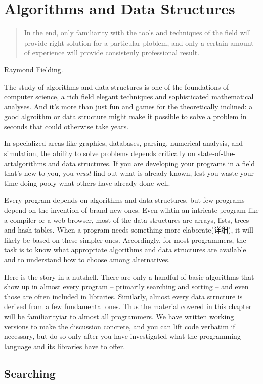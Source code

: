 \chapter{Algorithms and Data Structures}
\label{chap:alds}
\begin{quote}
    In the end, only familiarity with the tools and techniques of the field
    will provide right solution for a particular ploblem, and only a
    certain amount of experience will provide consistenly professional
    result.
\end{quote}
\begin{quotesrc}
    Raymond Fielding.
\end{quotesrc}
The study of algorithms and data structures is one of the foundations of
computer science, a rich field elegant techniques and sophisticated
mathematical analyses. And it's more than just fun and games for the
theoretically inclined: a good algroithm or data structure might make it
possible to solve a problem in seconds that could otherwise take years.

In specialized areas like graphics, databases, parsing, numerical analysis,
and simulation, the ability to solve problems depends critically on
state-of-the-artalgorithms and data structures. If you are developing your
programs in a field that's new to you, you \textit{must} find out what is
already known, lest you waste your time doing pooly what others have already
 done well.

Every program depends on algorithms and data structures, but few programs
depend on the invention of brand new ones. Even wihtin an intricate program
like a compiler or a web browser, most of the data structures are arrays,
lists, trees and hash tables. When a program needs something more
elaborate(详细), it will likely be based on these simpler ones.
Accordingly, for most programmers, the task is to know what appropriate
algorithms and data structures are available and to understand how to
choose among alternatives.

Here is the story in a nutshell. There are only a handful of basic
algorithms that show up in almost every program -- primarily searching and
sorting -- and even those are often included in libraries. Similarly,
almost every data structure is derived from a few fundamental ones. Thus
the material covered in this chapter will be familiarityiar to almost all
programmers. We have written working versions to make the discussion
concrete, and you can lift code verbatim if necessary, but do so only after
you have investigated what the programming language and its libraries have
to offer.

\section{Searching}

